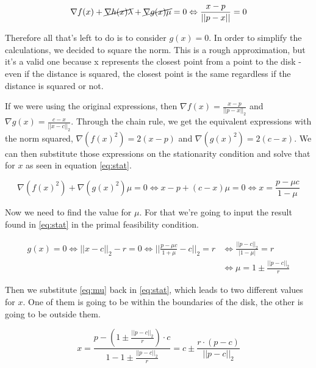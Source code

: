 \begin{equation}
\label{eq:gleq0}
    \nabla f(x) + \cancel{\nabla h(x) \lambda} + \cancel{\nabla g(x)\mu}= 0  \Leftrightarrow \frac{x - p}{||p - x||} = 0
\end{equation}

Therefore all that's left to do is to consider $g(x) = 0$. In order to simplify the calculations, we decided to square the norm. This is a rough approximation, but it's a valid one because x represents the closest point from a point to the disk - even if the distance is squared, the closest point is the same regardless if the distance is squared or not. 

If we were using the original expressions, then $\nabla f(x) = \frac{x - p}{||p - x||_2}$ and $\nabla g(x) = \frac{c - x}{||x - c||_2}$. Through the chain rule, we get the equivalent expressions with the norm squared, $\nabla(f(x)^2) = 2(x - p)$ and $\nabla(g(x)^2) = 2(c - x)$. We can then substitute those expressions on the stationarity condition and solve that for $x$ as seen in equation \eqref{eq:stat}.

\begin{equation}
\label{eq:stat}
    \nabla(f(x)^2) + \nabla(g(x)^2) \mu = 0 \Leftrightarrow x - p + (c - x)\mu = 0 \Leftrightarrow x = \frac{p - \mu c}{1 - \mu}
\end{equation}

Now we need to find the value for $\mu$. For that we're going to input the result found in \eqref{eq:stat} in the primal feasibility condition.

\begin{equation}
\begin{aligned}
\label{eq:mu}
    g(x) = 0 \Leftrightarrow ||x - c||_2 - r = 0 \Leftrightarrow ||\frac{p - \mu c}{1 + \mu} - c||_2 = r & \Leftrightarrow \frac{||p-c||_2}{|1 - \mu|} = r \\ & \Leftrightarrow \mu = 1 \pm \frac{||p-c||_2}{r}
\end{aligned}
\end{equation}

Then we substitute \eqref{eq:mu} back in \eqref{eq:stat}, which leads to two different values for $x$. One of them is going to be within the boundaries of the disk, the other is going to be outside them.

\begin{equation}
    x = \frac{p - (1 \pm \frac{||p-c||_2}{r}) \cdot c}{1 - 1 \pm \frac{||p-c||_2}{r}} = c \pm \frac{r \cdot (p - c)}{||p - c||_2}
\end{equation}

